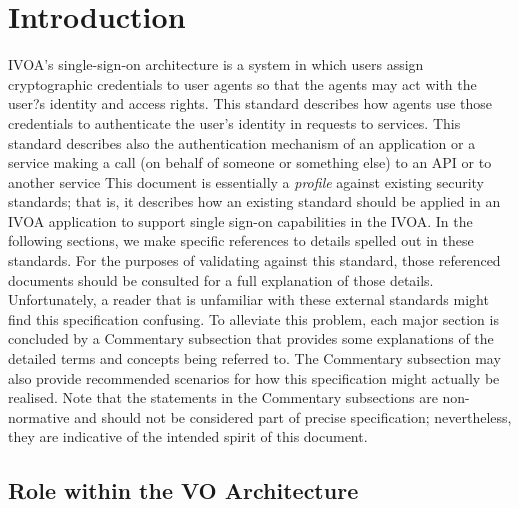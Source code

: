\documentclass[11pt,a4paper]{ivoa}
\begin{document}
\section{Introduction}
IVOA's single-sign-on architecture is a system in which users assign cryptographic credentials to user agents so that the agents may act with the user?s identity and access rights. This standard describes how agents use those credentials to authenticate the user's identity in requests to services. This standard describes also the authentication mechanism of an application or a service making a call (on behalf of someone or something else) to an API or to another service
This document is essentially a {\em profile} against existing security standards; that is, it describes how an existing standard should be applied in an IVOA application to support single sign-on capabilities in the IVOA. In the following sections, we make specific references to details spelled out in these standards. For the purposes of validating against this standard, those referenced documents should be consulted for a full explanation of those details. Unfortunately, a reader that is unfamiliar with these external standards might find this specification confusing. To alleviate this problem, each major section is concluded by a Commentary subsection that provides some explanations of the detailed terms and concepts being referred to. The Commentary subsection may also provide recommended scenarios for how this specification might actually be realised. Note that the statements in the Commentary subsections are non-normative and should not be considered part of precise specification; nevertheless, they are indicative of the intended spirit of this document.

\subsection{Role within the VO Architecture}
\end{document}
